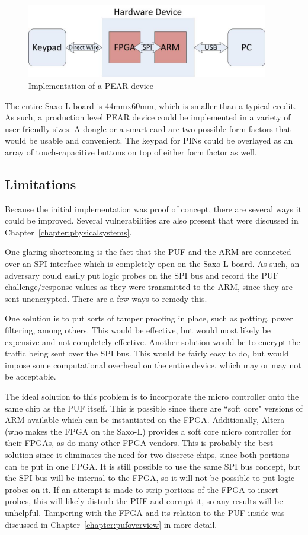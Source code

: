 \begin{figure}[!ht]
\centering
\includegraphics[width=400px]{images/pearimpl.jpg}
\caption{Implementation of a PEAR device}
\label{fig:peararchitecture}
\vspace{-20pt}
\end{figure}
\FloatBarrier

The entire Saxo-L board is 44mmx60mm, which is smaller than a typical credit. As such, a production level PEAR
device could be implemented in a variety of user friendly sizes. A dongle or a smart card are two possible form
factors that would be usable and convenient. The keypad for PINs could be overlayed as an array of touch-capacitive 
buttons on top of either form factor as well.

\subsection{Limitations}
Because the initial implementation was proof of concept, there are several ways it could be improved. Several
vulnerabilities are also present that were discussed in Chapter~\ref{chapter:physicalsystems}.

One glaring shortcoming is the fact that the PUF and the ARM are connected over an SPI interface which is completely
open on the Saxo-L board. As such, an adversary could easily put logic probes on the SPI bus and record the PUF
challenge/response values as they were transmitted to the ARM, since they are sent unencrypted. There are a few
ways to remedy this. 

One solution is to put sorts of tamper proofing in place, such as potting, power filtering, among others. 
This would be effective, but would most likely be expensive and not completely effective. Another solution would
be to encrypt the traffic being sent over the SPI bus. This would be fairly easy to do, but would impose some
computational overhead on the entire device, which may or may not be acceptable. 

The ideal solution to this problem is to incorporate the micro controller onto the same chip as the PUF itself. This
is possible since there are ``soft core" versions of ARM available which can be instantiated on the FPGA. Additionally,
Altera (who makes the FPGA on the Saxo-L) provides a soft core micro controller for their FPGAs, as do many other
FPGA vendors. This is probably the best solution since it eliminates the need for two discrete chips, since both portions
can be put in one FPGA. It is still possible to use the same SPI bus concept, but the SPI bus will be internal to the
FPGA, so it will not be possible to put logic probes on it. If an attempt is made to strip portions of the FPGA to
insert probes, this will likely disturb the PUF and corrupt it, so any results will be unhelpful. Tampering with the FPGA
and its relation to the PUF inside was discussed in Chapter~\ref{chapter:pufoverview} in more detail.

